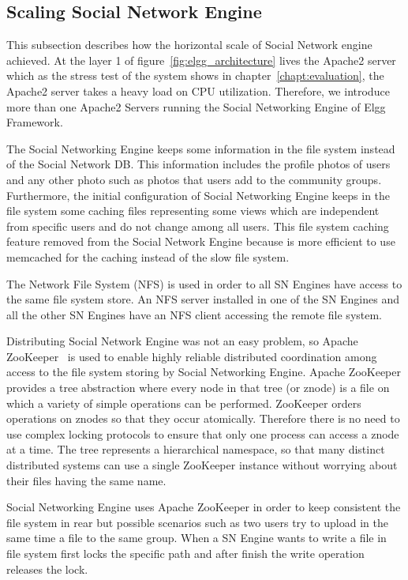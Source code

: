 \subsection{Scaling Social Network Engine}
\label{sec:engine_scale}

This subsection describes how the horizontal scale of Social Network engine achieved. At the layer 1 of figure~\ref{fig:elgg_architecture} lives the Apache2 server which as the stress test of the system shows in chapter~\ref{chapt:evaluation}, the Apache2 server takes a heavy load on CPU utilization. Therefore, we introduce more than one Apache2 Servers running the Social Networking Engine of Elgg Framework. 

The Social Networking Engine keeps some information in the file system instead of the Social Network DB. This information includes the profile photos of users and any other photo such as photos that users add to the community groups. Furthermore, the initial configuration of Social Networking Engine keeps in the file system some caching files representing some views which are independent from specific users and do not change among all users. This file system caching feature removed from the Social Network Engine because is more efficient to use memcached for the caching instead of the slow file system.

The Network File System (NFS) is used in order to all SN Engines have access to the same file system store. An NFS server installed in one of the SN Engines and all the other SN Engines have an NFS client accessing the remote file system.   

Distributing Social Network Engine was not an easy problem, so Apache ZooKeeper~\cite{zookeeper_url} is used to enable highly reliable distributed coordination among access to the file system storing by Social Networking Engine. 
Apache ZooKeeper provides a tree abstraction where every node in that tree (or znode) is a file on which a variety of simple operations can be performed. ZooKeeper orders operations on znodes so that they occur atomically. Therefore there is no need to use complex locking protocols to ensure that only one process can access a znode at a time. The tree represents a hierarchical namespace, so that many distinct distributed systems can use a single ZooKeeper instance without worrying about their files having the same name.

Social Networking Engine uses Apache ZooKeeper in order to keep consistent the file system in rear but possible scenarios such as two users try to upload in the same time a file to the same group. When a SN Engine wants to write a file in file system first locks the specific path and after finish the write operation releases the lock.


